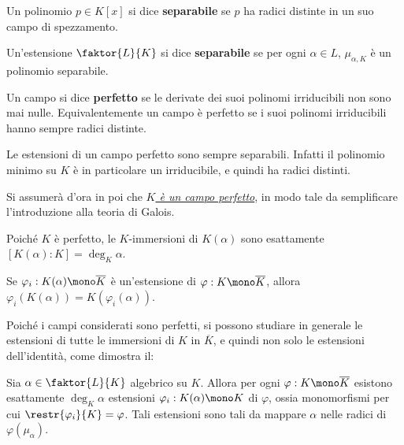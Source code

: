 \documentclass[12pt]{scrartcl}
\begin{document}
	\hr
	
	\begin{definition}
		Un polinomio $p \in K[x]$ si dice \textbf{separabile}
		se $p$ ha radici distinte in un suo campo di
		spezzamento.
	\end{definition}
	
	\begin{definition}
		Un'estensione $\faktor{L}{K}$ si dice \textbf{separabile}
		se per ogni $\alpha \in L$, $\mu_{\alpha,K}$ è
		un polinomio separabile.
	\end{definition}
	
	\begin{definition}
		Un campo si dice \textbf{perfetto} se le derivate dei
		suoi polinomi irriducibili non sono mai nulle. 
		Equivalentemente un campo è perfetto se i suoi
		polinomi irriducibili hanno sempre radici distinte.
	\end{definition}
	
	\begin{remark}
		Le estensioni di un campo perfetto sono sempre separabili.
		Infatti il polinomio minimo su $K$ è in particolare
		un irriducibile, e quindi ha radici distinti.
	\end{remark}
	
	\begin{note}
		Si assumerà d'ora in poi che \underline{\textit{$K$
		è un campo perfetto}}, in modo tale da semplificare l'introduzione
		alla teoria di Galois.
	\end{note}
	
	\begin{remark}
		Poiché $K$ è perfetto, le $K$-immersioni di $K(\alpha)$
		sono esattamente $[K(\alpha) : K] = \deg_K \alpha$.
	\end{remark}
	
	\begin{remark}
		Se $\varphi_i : K(\alpha) \mono \overline{K}$ è un'estensione di $\varphi : K \mono \overline{K}$, allora
		$\varphi_i(K(\alpha)) = K(\varphi_i(\alpha))$.
	\end{remark}

	Poiché i campi considerati sono perfetti, si possono
	studiare in generale le estensioni di tutte le immersioni
	di $K$ in $\overline{K}$, e quindi non solo le estensioni
	dell'identità, come dimostra il:
	
	\begin{theorem}
		Sia $\alpha \in \faktor{L}{K}$ algebrico su $K$. Allora
		per ogni $\varphi : K \mono \overline{K}$ esistono
		esattamente $\deg_K \alpha$ estensioni $\varphi_i : K(\alpha) \mono K$ di $\varphi$, ossia monomorfismi per cui $\restr{\varphi_i}{K} = \varphi$. Tali estensioni sono tali da mappare $\alpha$
		nelle radici di $\varphi(\mu_\alpha)$.
	\end{theorem}
	
\end{document}
